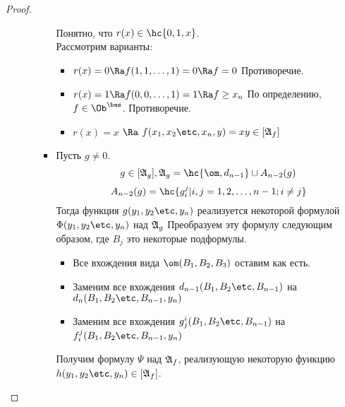 \documentclass[unicode,10pt]{article}
\begin{document}
\begin{proof}
\begin{itemize}
\begin{itemize}
\begin{itemize}
\begin{denote}
              \end{denote}
              Понятно, что $r(x) \in \hc{0, 1, x}$.\\
              Рассмотрим варианты:
              \begin{itemize}
                \item
                  \begin{math}
                    r(x) = 0 \Ra f(1,1,\ldots,1) = 0 \Ra f=0
                  \end{math}
                  Противоречие.
                \item
                  \begin{math}
                    r(x) = 1 \Ra f(0,0,\ldots,1) = 1 \Ra f\ge x_n
                  \end{math}
                  По определению, $f \in \Oib$. Противоречие.
                \item $r(x) = x$ $\Ra$  $ f(\set[x]{n},y) = xy \in [\ag_f]$
              \end{itemize}
            \item Пусть $g \ne 0$. \WHY
              \begin{displaymath}
                g \in [\ag_g], \ag_g=\hc{\om, d_{n-1}}\cup A_{n-2}(g)
              \end{displaymath}
              \begin{displaymath}
                A_{n-2}(g) = \hc{ g_i^j |i,j=1,2,\ldots,n-1; i\ne j }
              \end{displaymath}
              Тогда функция $g(\set[y]{n})$ реализуется некоторой формулой  $\Phi(\set[y]{n})$ над $\mathfrak{A}_g$
              Преобразуем эту формулу следующим образом, где $B_j$ это некоторые подформулы.
              \begin{itemize}
                \item Все вхождения вида $\om(B_1,B_2,B_3)$ оставим как есть.
                \item Заменим все вхождения $d_{n-1}(\set[B]{n-1})$ на $d_n(\set[B]{n-1},y_n)$
                \item Заменим все вхождения $g^i_j(\set[B]{n-1})$ на \CHECK $f^j_i(\set[B]{n-1},y_n)$
              \end{itemize}
              Получим формулу $\Psi$ над $\mathfrak{A}_f$, реализующую некоторую функцию $h(\set[y]{n}) \in [\ag_f]$.

\end{itemize}
\end{itemize}
\end{itemize}
\end{proof}
\end{document}
